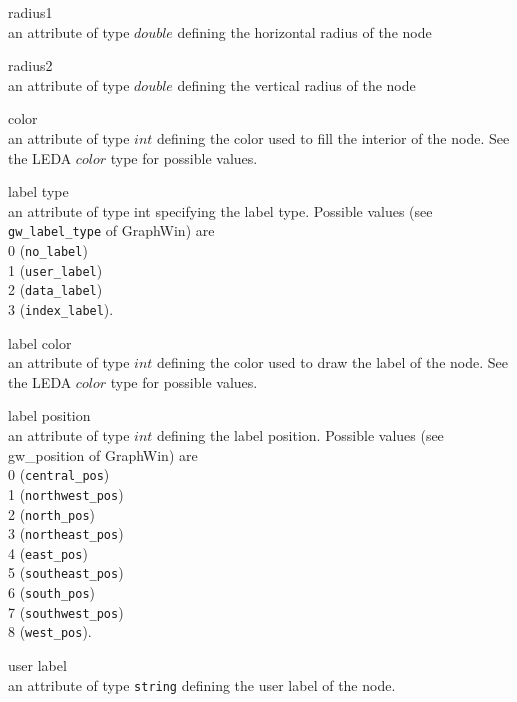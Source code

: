 \begin{description}
\item{radius1}\\
an attribute of type $double$ defining the horizontal radius of the node

\item{radius2}\\
an attribute of type $double$ defining the vertical radius of the node

\item{color}\\
an attribute of type $int$ defining the color used 
to fill the interior of the node. See the LEDA $color$ type for
possible values.

\item{label type}\\
an attribute of type int specifying the label type.
Possible values (see {\tt gw\_label\_type} of GraphWin) are\\
0 ({\tt no\_label})\\ 
1 ({\tt user\_label})\\
2 ({\tt data\_label})\\
3 ({\tt index\_label}). 

\item{label color}\\
an attribute of type $int$ defining the color used to draw the label of 
the node. See the LEDA $color$ type for possible values.

\item{label position}\\
an attribute of type $int$ defining the label position.
Possible values (see {gw\_position} of GraphWin) are\\ 
0 ({\tt central\_pos})\\
1 ({\tt northwest\_pos})\\
2 ({\tt north\_pos})\\
3 ({\tt northeast\_pos})\\
4 ({\tt east\_pos})\\
5 ({\tt southeast\_pos})\\
6 ({\tt south\_pos})\\
7 ({\tt southwest\_pos})\\
8 ({\tt west\_pos}).


\item{user label}\\
an attribute of type {\tt string} defining the user 
label of the node.
 
\end{description}

